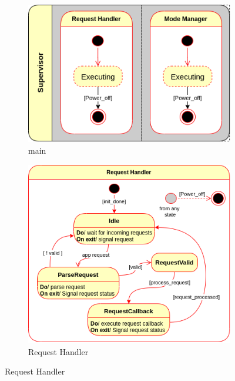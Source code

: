 \begin{figure}[htb!]
  \centering
  \begin{subfigure}[t]{.4\textwidth}
  \includegraphics[width=\textwidth]{img/state-mach-local-superv-main.png}%
  \caption{main}%
  \label{fig:state-mach-local-superv-main}
\end{subfigure}
%
\hspace{.05\textwidth}
%
  \begin{subfigure}[t]{.42\textwidth}
  \includegraphics[width=\textwidth]{img/state-mach-local-superv-req.png}%
  \caption{Request Handler}%
  \label{fig:state-mach-local-superv-req}
\end{subfigure}

\end{figure}
